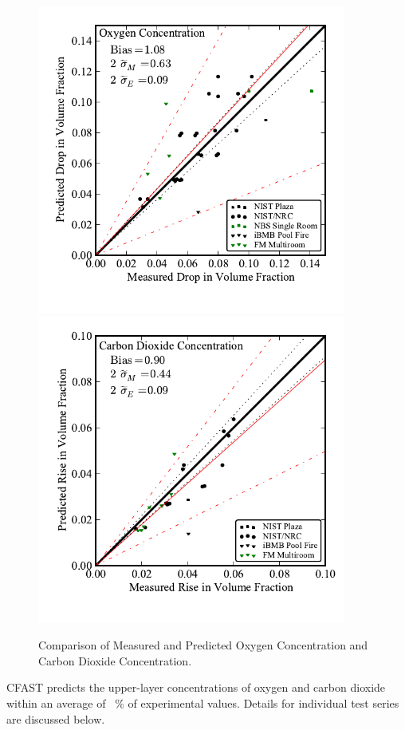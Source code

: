 \begin{figure}
\begin{center}
\includegraphics[width=4.0in]{FIGURES/ScatterPlots/Oxygen_Concentration}  \\
\includegraphics[width=4.0in]{FIGURES/ScatterPlots/Carbon_Dioxide_Concentration}  \\
\end{center}
\caption{Comparison of Measured and Predicted Oxygen Concentration and Carbon Dioxide Concentration.} \label{fig:Species_Scatter}
\end{figure}

CFAST predicts the upper-layer concentrations of oxygen and carbon dioxide within an average of \Speciesavg~\% of experimental values. Details for individual test series are discussed below. 

